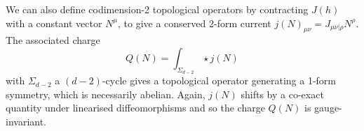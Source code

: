 We can also define codimension-2 topological operators by contracting $J(h)$ with a constant vector $N^\mu$, to give a conserved 2-form current $j(N)_{\mu\nu} = J_{\mu\nu|\rho}N^\rho$. The associated charge
\begin{equation}\label{eq:Q(N)}
    Q(N) = \int_{\Sigma_{d-2}} \star j(N)
\end{equation}
with $\Sigma_{d-2}$ a $(d-2)$-cycle gives a topological operator generating a 1-form symmetry, which is necessarily abelian. Again, $j(N)$ shifts by a co-exact quantity under linearised diffeomorphisms and so the charge $Q(N)$ is gauge-invariant.
